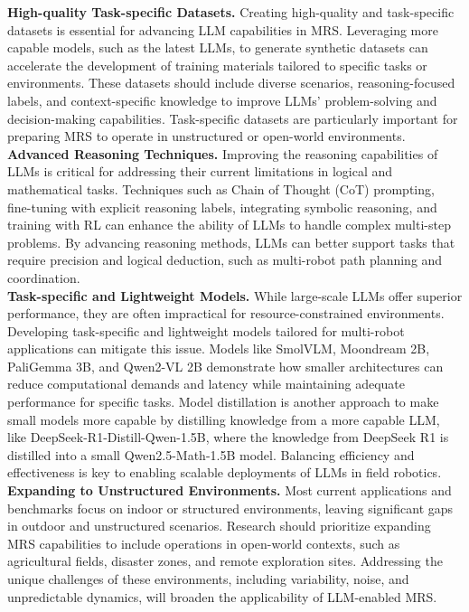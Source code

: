 \noindent\textbf{High-quality Task-specific Datasets.}
Creating high-quality and task-specific datasets is essential for advancing LLM capabilities in MRS. Leveraging more capable models, such as the latest LLMs, to generate synthetic datasets can accelerate the development of training materials tailored to specific tasks or environments. These datasets should include diverse scenarios, reasoning-focused labels, and context-specific knowledge to improve LLMs' problem-solving and decision-making capabilities. Task-specific datasets are particularly important for preparing MRS to operate in unstructured or open-world environments.\\

\noindent\textbf{Advanced Reasoning Techniques.}
Improving the reasoning capabilities of LLMs is critical for addressing their current limitations in logical and mathematical tasks. Techniques such as Chain of Thought (CoT) prompting, fine-tuning with explicit reasoning labels, integrating symbolic reasoning, and training with RL can enhance the ability of LLMs to handle complex multi-step problems. By advancing reasoning methods, LLMs can better support tasks that require precision and logical deduction, such as multi-robot path planning and coordination.\\

\noindent\textbf{Task-specific and Lightweight Models.}
While large-scale LLMs offer superior performance, they are often impractical for resource-constrained environments. Developing task-specific and lightweight models tailored for multi-robot applications can mitigate this issue. Models like SmolVLM, Moondream 2B, PaliGemma 3B, and Qwen2-VL 2B demonstrate how smaller architectures can reduce computational demands and latency while maintaining adequate performance for specific tasks. Model distillation is another approach to make small models more capable by distilling knowledge from a more capable LLM, like DeepSeek-R1-Distill-Qwen-1.5B, where the knowledge from DeepSeek R1 is distilled into a small Qwen2.5-Math-1.5B model. Balancing efficiency and effectiveness is key to enabling scalable deployments of LLMs in field robotics.\\

\noindent\textbf{Expanding to Unstructured Environments.}
Most current applications and benchmarks focus on indoor or structured environments, leaving significant gaps in outdoor and unstructured scenarios. Research should prioritize expanding MRS capabilities to include operations in open-world contexts, such as agricultural fields, disaster zones, and remote exploration sites. Addressing the unique challenges of these environments, including variability, noise, and unpredictable dynamics, will broaden the applicability of LLM-enabled MRS.\\

